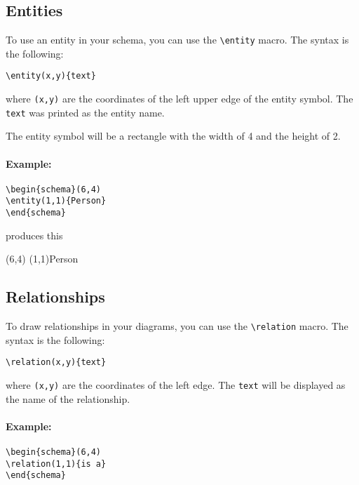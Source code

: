 \documentclass[a4paper,11pt]{article}
\begin{document}
\subsection{Entities}

To use an entity in your schema, you can use the \verb|\entity| macro.
The syntax is the following:

\begin{verbatim}
\entity(x,y){text}
\end{verbatim}

where {\tt (x,y)} are the coordinates of the left upper edge of the entity
symbol. The {\tt text} was printed as the entity name.

The entity symbol will be a rectangle with the width of 4 and the height of 2.

\paragraph{Example:}
\begin{verbatim}
\begin{schema}(6,4)
\entity(1,1){Person}
\end{schema}
\end{verbatim}

produces this

\begin{schema}(6,4)
\entity(1,1){Person}
\end{schema}

\subsection{Relationships}

To draw relationships in your diagrams, you can use the \verb|\relation| macro.
The syntax is the following:

\begin{verbatim}
\relation(x,y){text}
\end{verbatim}

where {\tt (x,y)} are the coordinates of the left edge. The {\tt text} will be displayed as 
the name of the relationship.

\paragraph{Example:}

\begin{verbatim}
\begin{schema}(6,4)
\relation(1,1){is a}
\end{schema}
\end{verbatim}
\end{document}
